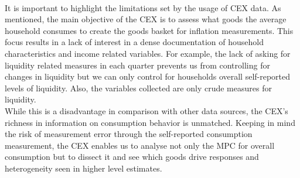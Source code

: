 \\ It is important to highlight the limitations set by the usage of CEX data. As mentioned, the main objective of the CEX is to assess what goods the average household consumes to create the goods basket for inflation measurements. This focus results in a lack of interest in a dense documentation of household characteristics and income related variables. For example, the lack of asking for liquidity related measures in each quarter prevents us from controlling for changes in liquidity but we can only control for households overall self-reported levels of liquidity. Also, the variables collected are only crude measures for liquidity. \\
While this is a disadvantage in comparison with other data sources, the CEX's richness in information on consumption behavior is unmatched. Keeping in mind the risk of measurement error through the self-reported consumption measurement, the CEX enables us to analyse not only the MPC for overall consumption but to dissect it and see which goods drive responses and heterogeneity seen in higher level estimates.